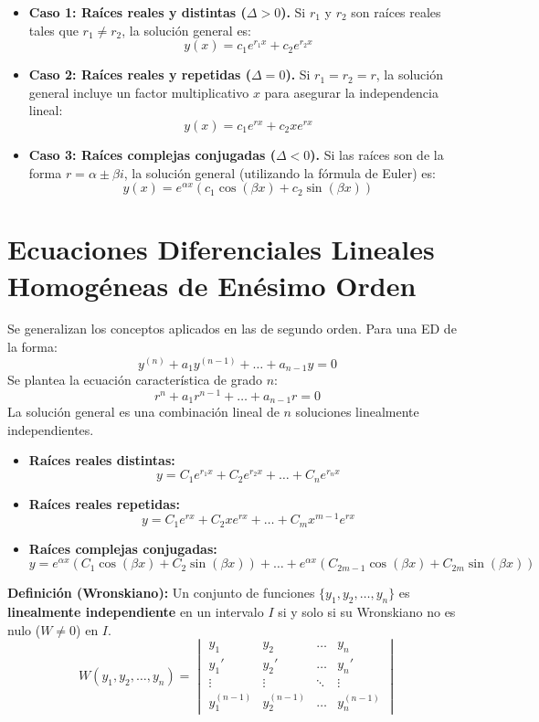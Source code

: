 \documentclass[a4paper,12pt]{article}
\begin{document}
\begin{itemize}
    \item \textbf{Caso 1: Raíces reales y distintas ($\Delta > 0$).}
    Si $r_1$ y $r_2$ son raíces reales tales que $r_1 \neq r_2$, la solución general es:
    $$ y(x) = c_1e^{r_1x} + c_2e^{r_2x} $$

    \item \textbf{Caso 2: Raíces reales y repetidas ($\Delta = 0$).}
    Si $r_1 = r_2 = r$, la solución general incluye un factor multiplicativo $x$ para asegurar la independencia lineal:
    $$ y(x) = c_1e^{rx} + c_2xe^{rx} $$

    \item \textbf{Caso 3: Raíces complejas conjugadas ($\Delta < 0$).}
    Si las raíces son de la forma $r = \alpha \pm \beta i$, la solución general (utilizando la fórmula de Euler) es:
    $$ y(x) = e^{\alpha x} (c_1 \cos(\beta x) + c_2 \sin(\beta x)) $$
\end{itemize}

\section{Ecuaciones Diferenciales Lineales Homogéneas de Enésimo Orden}
Se generalizan los conceptos aplicados en las de segundo orden. Para una ED de la forma:
$$ y^{(n)} + a_{1} y^{(n-1)} + \dots + a_{n-1} y = 0 $$
Se plantea la ecuación característica de grado $n$:
$$ r^n + a_{1} r^{n-1} + \dots + a_{n-1} r = 0 $$
La solución general es una combinación lineal de $n$ soluciones linealmente independientes.
\begin{itemize}
    \item \textbf{Raíces reales distintas:}
            $$ y = C_1e^{r_1x} + C_2e^{r_2x} + \dots + C_ne^{r_nx} $$
    \item \textbf{Raíces reales repetidas:}
            $$ y = C_1e^{rx} + C_2xe^{rx} + \dots + C_m x^{m-1}e^{rx} $$
    \item \textbf{Raíces complejas conjugadas:}
            $$ y = e^{\alpha x} (C_1 \cos(\beta x) + C_2 \sin(\beta x)) + \dots + e^{\alpha x} (C_{2m-1} \cos(\beta x) + C_{2m} \sin(\beta x)) $$
\end{itemize}

\textbf{Definición (Wronskiano):}
Un conjunto de funciones $\{y_1, y_2, \dots, y_n\}$ es \textbf{linealmente independiente} en un intervalo $I$ si y solo si su Wronskiano no es nulo ($W \neq 0$) en $I$.
$$ W(y_1, y_2, \dots, y_n) = \begin{vmatrix}
y_1 & y_2 & \dots & y_n \\
y_1' & y_2' & \dots & y_n' \\
\vdots & \vdots & \ddots & \vdots \\
y_1^{(n-1)} & y_2^{(n-1)} & \dots & y_n^{(n-1)}
\end{vmatrix} $$
\end{document}
